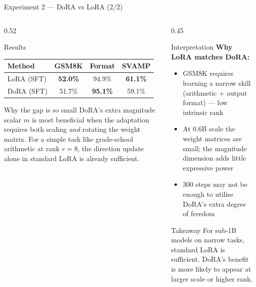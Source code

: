 \documentclass[aspectratio=169,10pt]{beamer}
\begin{document}
\begin{frame}{Experiment 2 — DoRA vs LoRA (2/2)}

  \begin{columns}[T]
    \begin{column}{0.52\textwidth}
      \begin{block}{Results}
        \begin{center}
        \begin{tabular}{lccc}
          \toprule
          Method & GSM8K & Format & SVAMP \\
          \midrule
          LoRA (SFT)  & \textbf{52.0\%} & 94.9\% & \textbf{61.1\%} \\
          DoRA (SFT)  & 51.7\%          & \textbf{95.1\%} & 59.1\% \\
          \bottomrule
        \end{tabular}
        \end{center}
      \end{block}

      \vspace{0.5em}
      \begin{block}{Why the gap is so small}
        \small
        DoRA's extra magnitude scalar $m$ is most beneficial when
        the adaptation requires both scaling \emph{and} rotating
        the weight matrix. For a simple task like grade-school
        arithmetic at rank $r=8$, the direction update alone
        in standard LoRA is already sufficient.
      \end{block}
    \end{column}

    \begin{column}{0.45\textwidth}
      \begin{block}{Interpretation}
        \small
        \textbf{Why LoRA matches DoRA:}
        \begin{itemize}
          \item GSM8K requires learning a narrow skill
                (arithmetic + output format) — low intrinsic rank
          \item At 0.6B scale the weight matrices are small;
                the magnitude dimension adds little expressive power
          \item 300 steps may not be enough to utilise
                DoRA's extra degree of freedom
        \end{itemize}
      \end{block}

      \vspace{0.5em}
      \begin{block}{Takeaway}
        \small
        For sub-1B models on narrow tasks, standard LoRA
        is sufficient. DoRA's benefit is more likely to
        appear at larger scale or higher rank.
      \end{block}
    \end{column}
  \end{columns}
\end{frame}
\end{document}
